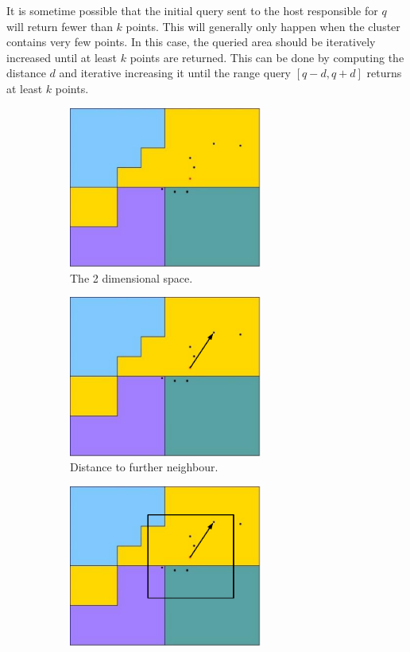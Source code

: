 \documentclass[11pt,a4paper]{globis-book}
\begin{document}
It is sometime possible that the initial query sent to the host responsible for $q$ will return fewer than $k$ points. This will generally only happen when the cluster contains very few points. In this case, the queried area should be iteratively increased until at least $k$ points are returned. This can be done by computing the distance $d$ and iterative increasing it until the range query $[q - d, q + d]$ returns at least $k$ points.

\begin{figure}[h]
    \centering
    \begin{subfigure}[b]{0.4\linewidth}
        \includegraphics[width = 2.5in]{images/zordering-knn-a}
        \caption{The 2 dimensional space.}
    \end{subfigure}%
    \qquad
    \begin{subfigure}[b]{0.4\linewidth}
        \includegraphics[width = 2.5in]{images/zordering-knn-b}
        \caption{Distance to further neighbour.}
    \end{subfigure}
    \begin{subfigure}[b]{0.4\linewidth}
        \includegraphics[width = 2.5in]{images/zordering-knn-c}

\end{subfigure}
\end{figure}
\end{document}
